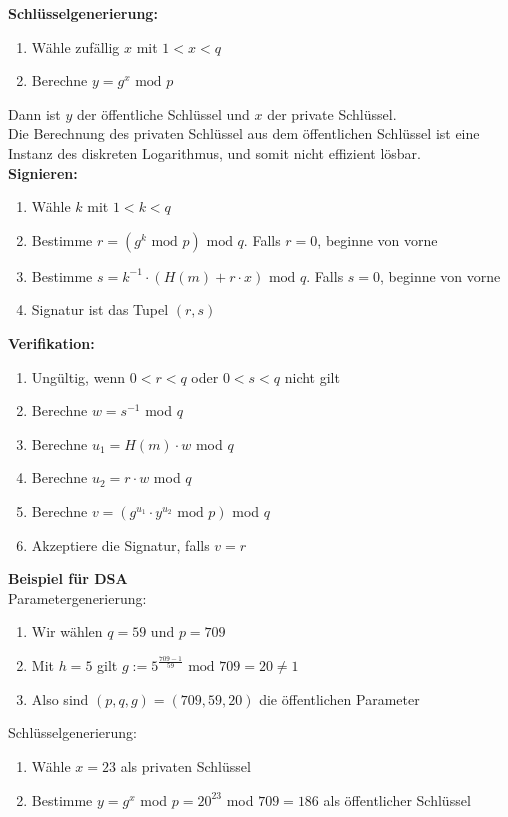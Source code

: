 \documentclass[a4paper,12pt,leqno]{article}
\begin{document}
\textbf{Schlüsselgenerierung:}
\begin{enumerate}
\item Wähle zufällig $x$ mit $1<x<q$
\item Berechne $y=g^x\textrm{ mod }p$
\end{enumerate}
Dann ist $y$ der öffentliche Schlüssel und $x$ der private Schlüssel.\\
Die Berechnung des privaten Schlüssel aus dem öffentlichen Schlüssel ist eine Instanz des diskreten Logarithmus, und somit nicht effizient lösbar.\\

\textbf{Signieren:}
\begin{enumerate}
\item Wähle $k$ mit $1<k<q$
\item Bestimme $r=(g^k\textrm{ mod }p)\textrm{ mod }q$. Falls $r=0$, beginne von vorne
\item Bestimme $s=k^{-1}\cdot (H(m)+r\cdot x)\textrm{ mod }q$. Falls $s=0$, beginne von vorne
\item Signatur ist das Tupel $(r,s)$
\end{enumerate}
\textbf{Verifikation:}
\begin{enumerate}
\item Ungültig, wenn $0<r<q$ oder $0<s<q$ nicht gilt
\item Berechne $w=s^{-1}$ mod $q$
\item Berechne $u_1=H(m)\cdot w$ mod $q$
\item Berechne $u_2=r\cdot w$ mod $q$
\item Berechne $v=(g^{u_1}\cdot y^{u_2}\textrm{ mod }p)$ mod $q$
\item Akzeptiere die Signatur, falls $v=r$
\end{enumerate}

\newpage

\textbf{Beispiel für DSA}\\
Parametergenerierung:
\begin{enumerate}
\item Wir wählen $q=59$ und $p=709$
\item Mit $h=5$ gilt $g:=5^{\frac{709-1}{59}}\textrm{ mod }709=20 \neq 1$
\item Also sind $(p,q,g)=(709,59,20)$ die öffentlichen Parameter
\end{enumerate}
Schlüsselgenerierung:
\begin{enumerate}
\item Wähle $x=23$ als privaten Schlüssel
\item Bestimme $y=g^x$ mod $p=20^{23}$ mod $709=186$ als öffentlicher Schlüssel
\end{enumerate}
\end{document}
